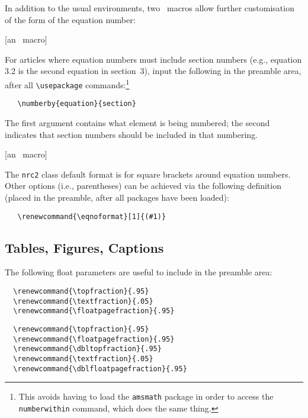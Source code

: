 \noindent In addition to the usual environments, two \NRC\ macros
allow further customisation of the form of the equation number:

\begin{description} \itemsep=0pt
   \item [{\tt \blash
         numberby\char`\{...\char`\}\char`\{...\char`\}}] \hfill [an
         \NRC\ macro]\mbox{}

         For articles where equation numbers must include section
         numbers (e.g., equation 3.2 is the second equation in
         section~3), input the following in the preamble area, after
         all \verb|\usepackage| commands:\footnote{This avoids having
         to load the {\tt amsmath} package in order to access the {\tt
         \blash numberwithin} command, which does the same thing.} 

\begin{verbatim} 
   \numberby{equation}{section}
\end{verbatim} 

         The first argument contains what element is being numbered;
         the second indicates that section numbers should be included
         in that numbering.

   \item [{\tt \blash eqnoformat}] \hfill [an \NRC\ macro]\mbox{}

         The \verb|nrc2| class default format is for square brackets
         around equation numbers. Other options (i.e., parenthe\-ses)
         can be achieved via the following definition (placed in the
         preamble, after all packages have been loaded):

\begin{verbatim}
   \renewcommand{\eqnoformat}[1]{(#1)}
\end{verbatim}
\end{description}


\subsection{Tables, Figures, Captions}

The following float parameters are useful to include in the preamble
area: 

\begin{description} \itemsep=0pt
   \item [nrc1] 
\begin{verbatim}
  \renewcommand{\topfraction}{.95}
  \renewcommand{\textfraction}{.05}
  \renewcommand{\floatpagefraction}{.95}
\end{verbatim}

   \item [nrc2] 
\begin{verbatim}
  \renewcommand{\topfraction}{.95}
  \renewcommand{\floatpagefraction}{.95}
  \renewcommand{\dbltopfraction}{.95}
  \renewcommand{\textfraction}{.05}
  \renewcommand{\dblfloatpagefraction}{.95}
\end{verbatim}
\end{description}


